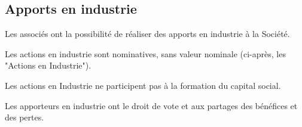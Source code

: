 \documentclass[a4paper,12pt]{report}
\begin{document}
%
%
%
%
%
%
%

\subsection{Apports en industrie}

Les associés ont la possibilité de réaliser des apports en industrie à la Société.

Les actions en industrie sont nominatives, sans valeur nominale (ci-après, les "Actions en Industrie").

Les actions en Industrie ne participent pas à la formation du capital social.

Les apporteurs en industrie ont le droit de vote et aux partages des bénéfices et des pertes.

%
\end{document}
